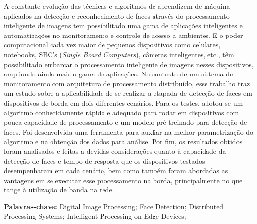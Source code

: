 \begin{resumo}

A constante evolução das técnicas e algoritmos de aprendizem de máquina aplicados na detecção e reconhecimento de faces através do processamento inteligente de imagens tem possibilitado uma gama de aplicações inteligentes e automatizações no monitoramento e controle de acesso a ambientes. E o poder computacional cada vez maior de pequenos dispositivos como celulares, notebooks, SBC's (\textit{Single Board Computers}), câmeras inteligentes, etc., têm possibilitado embarcar o processamento inteligente de imagens nesses dispositivos, ampliando ainda mais a gama de aplicações. No contexto de um sistema de monitoramento com arquitetura de processamento distribuído, esse trabalho traz um estudo sobre a aplicabilidade de se realizar a etapada de detecção de faces em dispositivos de borda em dois diferentes cenários. Para os testes, adotou-se um algoritmo conhecidamente rápido e adequado para rodar em dispositivos com pouca capacidade de processamento e um modelo pré-treinado para detecção de faces. Foi desenvolvida uma ferramenta para auxliar na melhor parametrização do algoritmo e na obtenção dos dados para análise. Por fim, os resultados obtidos foram analisados e feitas a devidas considerações quanto à capacidade da detecção de faces e tempo de resposta que os dispositivos testados desempenharam em cada cenário, bem como também foram abordadas as vantagens em se executar esse processamento na borda, principalmente no que tange à utilização de banda na rede. 

\vspace{0.5cm}
 
 \textbf{Palavras-chave:} Digital Image Processing; Face Detection; Distributed Processing Systems; Intelligent Processing on Edge Devices;
\end{resumo}